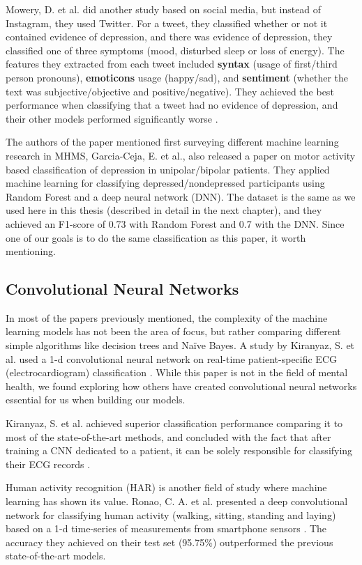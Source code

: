 Mowery, D. et al. did another study based on social media, but instead of Instagram, they used Twitter. For a tweet, they classified whether or not it contained evidence of depression, and there was evidence of depression, they classified one of three symptoms (mood, disturbed sleep or loss of energy). The features they extracted from each tweet included \textbf{syntax} (usage of first/third person pronouns), \textbf{emoticons} usage (happy/sad), and \textbf{sentiment} (whether the text was subjective/objective and positive/negative). They achieved the best performance when classifying that a tweet had no evidence of depression, and their other models performed significantly worse \cite{twitter_depression}. 

The authors of the paper mentioned first surveying different machine learning research in MHMS, Garcia-Ceja, E. et al., also released a paper on motor activity based classification of depression in unipolar/bipolar patients. They applied machine learning for classifying depressed/nondepressed participants using Random Forest and a deep neural network (DNN). The dataset is the same as we used here in this thesis (described in detail in the next chapter), and they achieved an F1-score of 0.73 with Random Forest and 0.7 with the DNN. Since one of our goals is to do the same classification as this paper, it worth mentioning.

\subsection{Convolutional Neural Networks}

In most of the papers previously mentioned, the complexity of the machine learning models has not been the area of focus, but rather comparing different simple algorithms like decision trees and Naïve Bayes. A study by Kiranyaz, S. et al. used a 1-d convolutional neural network on real-time patient-specific ECG (electrocardiogram) classification \cite{ecg_1d_conv}. While this paper is not in the field of mental health, we found exploring how others have created convolutional neural networks essential for us when building our models. 

Kiranyaz, S. et al. achieved superior classification performance comparing it to most of the state-of-the-art methods, and concluded with the fact that after training a CNN dedicated to a patient, it can be solely responsible for classifying their ECG records \cite{ecg_1d_conv}. 

Human activity recognition (HAR) is another field of study where machine learning has shown its value. Ronao, C. A. et al. presented a deep convolutional network for classifying human activity (walking, sitting, standing and laying) based on a 1-d time-series of measurements from smartphone sensors \cite{ronao_har_conv}. The accuracy they achieved on their test set (95.75\%) outperformed the previous state-of-the-art models. 

